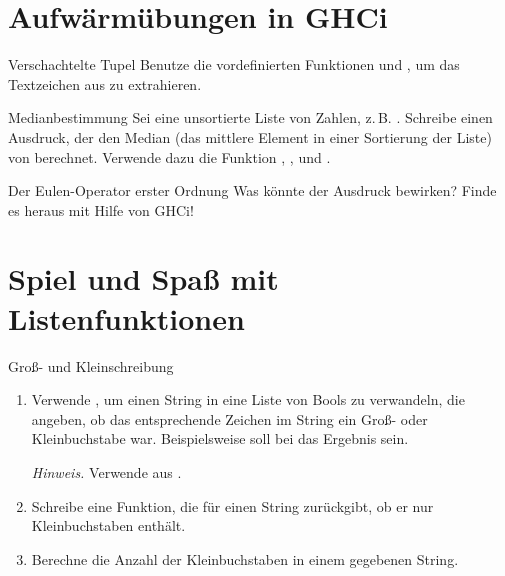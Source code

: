 \documentclass{uebblatt}
\begin{document}


\section{Aufwärmübungen in GHCi}

\begin{aufgabe}{Verschachtelte Tupel}
Benutze die vordefinierten Funktionen  und , um das Textzeichen aus  zu extrahieren.
\end{aufgabe}

\begin{aufgabe}{Medianbestimmung}
Sei  eine unsortierte Liste von Zahlen, z.\,B. . Schreibe einen Ausdruck, der den Median (das mittlere Element in einer Sortierung der Liste) von  berechnet. Verwende dazu die Funktion , ,  und \haskellinline{!!}.
\end{aufgabe}

\begin{aufgabe}{Der Eulen-Operator erster Ordnung}
Was könnte der Ausdruck  bewirken? Finde es heraus mit Hilfe von GHCi!
\end{aufgabe}


\section{Spiel und Spaß mit Listenfunktionen}

\begin{aufgabe}{Groß- und Kleinschreibung}
  \begin{enumerate}
    \item Verwende , um einen String in eine Liste von Bools zu verwandeln, die angeben, ob das entsprechende Zeichen im String ein Groß- oder Kleinbuchstabe war.
    Beispielsweise soll bei  das Ergebnis  sein. \\
    {\scriptsize \emph{Hinweis.} Verwende  aus .\par}
    \item Schreibe eine Funktion, die für einen String zurückgibt, ob er nur Kleinbuchstaben enthält.
    \item Berechne die Anzahl der Kleinbuchstaben in einem gegebenen String.
  \end{enumerate}
\end{aufgabe}
\end{document}
